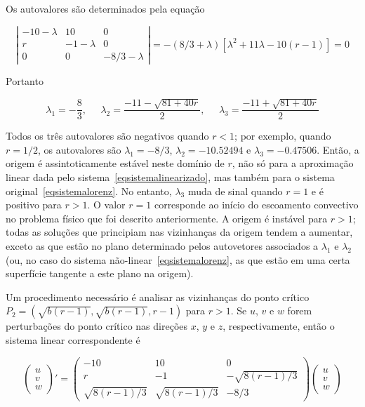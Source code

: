 Os autovalores são determinados pela equação

\begin{equation}
\left|\begin{array}{ccc}-10-\lambda & 10 & 0  \\ r & -1-\lambda & 0 \\ 0 & 0 & -8/3-\lambda \end{array}\right|=-(8/3+\lambda)[\lambda^2+11\lambda-10(r-1)]=0
\label{eqmatrizautovalor}
\end{equation}

Portanto

\begin{equation}
\lambda_{1}=-\frac{8}{3}, \;\;\;\;\; \lambda_{2}=\frac{-11-\sqrt{81+40r}}{2}, \;\;\;\;\; \lambda_{3}=\frac{-11+\sqrt{81+40r}}{2}
\label{eqpontoscriticos}
\end{equation}

Todos os três autovalores são negativos quando $r<1$; por exemplo, quando $r=1/2$, os autovalores são $\lambda_{1}=-8/3$, $\lambda_{2}=-10.52494$ e $\lambda_{3}=-0.47506$. Então, a origem é assintoticamente estável neste domínio de $r$, não só para a aproximação linear dada pelo sistema~\ref{eqsistemalinearizado}, mas também para o sistema original~\ref{eqsistemalorenz}. No entanto, $\lambda_{3}$ muda de sinal quando $r=1$ e é positivo para $r>1$. O valor $r=1$ corresponde ao início do escoamento convectivo no problema físico que foi descrito anteriormente. A origem é instável para $r>1$; todas as soluções que principiam nas vizinhanças da origem tendem a aumentar, exceto as que estão no plano determinado pelos autovetores associados a $\lambda_{1}$ e $\lambda_{2}$ (ou, no caso do sistema não-linear~\ref{eqsistemalorenz}, as que estão em uma certa superfície tangente a este plano na origem).

Um procedimento necessário é analisar as vizinhanças do ponto crítico $P_{2}=(\sqrt{b(r-1)},\sqrt{b(r-1)},r-1)$ para $r>1$. Se $u$, $v$ e $w$ forem perturbações do ponto crítico nas direções $x$, $y$ e $z$, respectivamente, então o sistema linear correspondente é

\begin{equation}
\left(\begin{array}{ccc}u \\ v \\ w \end{array}\right)'=
\left(\begin{array}{ccc}-10 & 10 & 0  \\ r & -1 & -\sqrt{8(r-1)/3} \\ \sqrt{8(r-1)/3} & \sqrt{8(r-1)/3} & -8/3 \end{array}\right)
\left(\begin{array}{ccc}u \\ v \\ w \end{array}\right)
\label{eqsistemalinearizadop2}
\end{equation}

